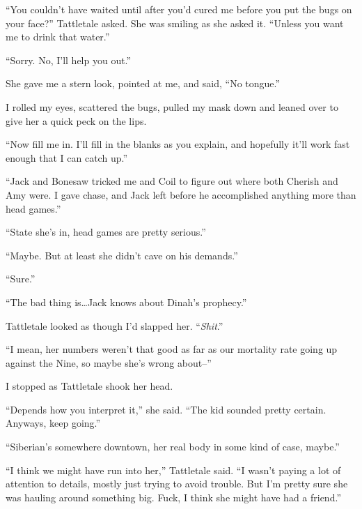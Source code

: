``You couldn't have waited until after you'd cured me before you put the bugs on your face?''  Tattletale asked.  She was smiling as she asked it.  ``Unless you want me to drink that water.''



``Sorry.  No, I'll help you out.''



She gave me a stern look, pointed at me, and said, ``No tongue.''



I rolled my eyes, scattered the bugs, pulled my mask down and leaned over to give her a quick peck on the lips.



``Now fill me in.  I'll fill in the blanks as you explain, and hopefully it'll work fast enough that I can catch up.''



``Jack and Bonesaw tricked me and Coil to figure out where both Cherish and Amy were.  I gave chase, and Jack left before he accomplished anything more than head games.''



``State she's in, head games are pretty serious.''



``Maybe.  But at least she didn't cave on his demands.''



``Sure.''



``The bad thing is\ldots Jack knows about Dinah's prophecy.''



Tattletale looked as though I'd slapped her.  ``\emph{Shit}.''



``I mean, her numbers weren't that good as far as our mortality rate going up against the Nine, so maybe she's wrong about--''



I stopped as Tattletale shook her head.



``Depends how you interpret it,'' she said. ``The kid sounded pretty certain.  Anyways, keep going.''



``Siberian's somewhere downtown, her real body in some kind of case, maybe.''



``I think we might have run into her,'' Tattletale said.  ``I wasn't paying a lot of attention to details, mostly just trying to avoid trouble.  But I'm pretty sure she was hauling around something big.  Fuck, I think she might have had a friend.''



